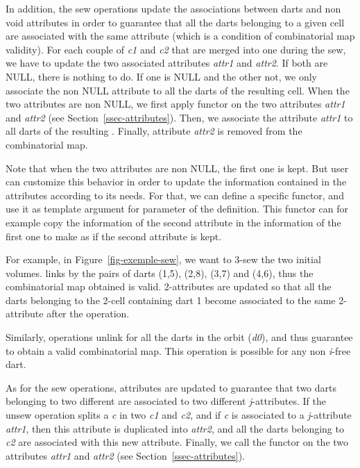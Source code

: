 In addition, the sew operations update the associations between darts
and non void attributes in order to guarantee that all the darts
belonging to a given cell are associated with the same attribute
(which is a condition of combinatorial map validity).  For each couple
of  \emph{c1} and \emph{c2} that are merged into one  during
the sew, we have to update the two associated attributes \emph{attr1} and
\emph{attr2}.  If both are NULL, there is nothing to do.  If one is NULL
and the other not, we only associate the non NULL attribute to all the
darts of the resulting cell.  When the two attributes are non NULL, we
first apply functor  on the two attributes \emph{attr1} and
\emph{attr2} (see Section~\ref{ssec-attributes}). Then, we associate the
attribute \emph{attr1} to all darts of the resulting . Finally,
attribute \emph{attr2} is removed from the combinatorial map. 

Note that when the two attributes are non NULL, the first one is
kept. But user can customize this behavior in order to update the
information contained in the attributes according to its needs.  For
that, we can define a specific functor, and use it as template
argument for  parameter of the 
definition. This functor can for example copy the information of the
second attribute in the information of the first one to make as if the
second attribute is kept.

For example, in Figure~\ref{fig-exemple-sew}, we want to 3-sew the two
initial volumes.  links by \betatrois{} the pairs of
darts (1,5), (2,8), (3,7) and (4,6), thus the combinatorial map
obtained is valid. 2-attributes are updated so that all the darts
belonging to the 2-cell containing dart 1 become associated to the
same 2-attribute after the operation.
%

Similarly,  operations unlink \betai{} for all the darts
in the orbit \orbit{\betaun{},$\ldots$,\betaimdeux{},\betaipdeux{},$\ldots$,\betad{}}(\emph{d0}), 
and thus guarantee to obtain a valid combinatorial map.  This
operation is possible for any non \emph{i}-free dart.

As for the sew operations, attributes are updated to
guarantee that two darts belonging to two different  are
associated to two different \emph{j}-attributes.  If the unsew operation
splits a  \emph{c} in two  \emph{c1} and \emph{c2}, and if \emph{c} is
associated to a \emph{j}-attribute \emph{attr1}, then this attribute is duplicated
into \emph{attr2}, and all the darts belonging to \emph{c2} are associated
with this new attribute.  Finally, we call the functor 
on the two attributes \emph{attr1} and \emph{attr2} (see
Section~\ref{ssec-attributes}).

